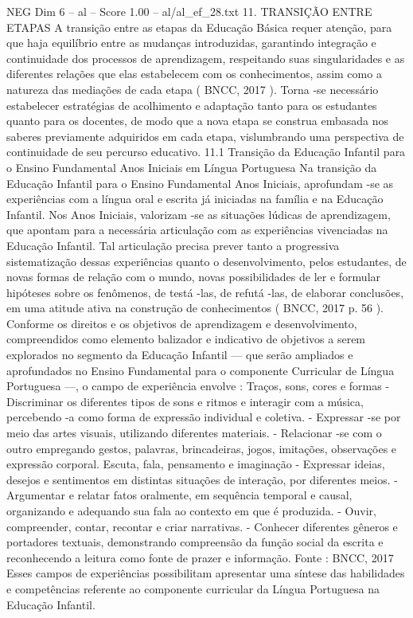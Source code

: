 \begin{textsample}{NEG Dim 6 – al – Score 1.00 – al/al\_ef\_28.txt}  \label{ex:f6_neg_066}
11.
TRANSIÇÃO ENTRE ETAPAS A transição entre as etapas da Educação Básica requer atenção, para que haja equilíbrio entre as mudanças introduzidas, garantindo integração e continuidade dos processos de aprendizagem, respeitando suas singularidades e as diferentes relações que elas estabelecem com os conhecimentos, assim como a natureza das mediações de cada etapa ( BNCC, 2017 ).
Torna -se necessário estabelecer estratégias de acolhimento e adaptação tanto para os estudantes quanto para os docentes, de modo que a nova etapa se construa embasada nos saberes previamente adquiridos em cada etapa, vislumbrando uma perspectiva de continuidade de seu percurso educativo. 11.1 Transição da Educação Infantil para o Ensino Fundamental Anos Iniciais em Língua Portuguesa Na transição da Educação Infantil para o Ensino Fundamental Anos Iniciais, aprofundam -se as experiências com a língua oral e escrita já iniciadas na família e na Educação Infantil.
Nos Anos Iniciais, valorizam -se as situações lúdicas de aprendizagem, que apontam para a necessária articulação com as experiências vivenciadas na Educação Infantil.
Tal articulação precisa prever tanto a progressiva sistematização dessas experiências quanto o desenvolvimento, pelos estudantes, de novas formas de relação com o mundo, novas possibilidades de ler e formular hipóteses sobre os fenômenos, de testá -las, de refutá -las, de elaborar conclusões, em uma atitude ativa na construção de conhecimentos ( BNCC, 2017 p. 56 ).
Conforme os direitos e os objetivos de aprendizagem e desenvolvimento, compreendidos como elemento balizador e indicativo de objetivos a serem explorados no segmento da Educação Infantil — que serão ampliados e aprofundados no Ensino Fundamental para o componente Curricular de Língua Portuguesa —, o campo de experiência envolve : Traços, sons, cores e formas - Discriminar os diferentes tipos de sons e ritmos e interagir com a música, percebendo -a como forma de expressão individual e coletiva. - Expressar -se por meio das artes visuais, utilizando diferentes materiais. - Relacionar -se com o outro empregando gestos, palavras, brincadeiras, jogos, imitações, observações e expressão corporal.
Escuta, fala, pensamento e imaginação - Expressar ideias, desejos e sentimentos em distintas situações de interação, por diferentes meios. - Argumentar e relatar fatos oralmente, em sequência temporal e causal, organizando e adequando sua fala ao contexto em que é produzida. - Ouvir, compreender, contar, recontar e criar narrativas. - Conhecer diferentes gêneros e portadores textuais, demonstrando compreensão da função social da escrita e reconhecendo a leitura como fonte de prazer e informação.
Fonte : BNCC, 2017 Esses campos de experiências possibilitam apresentar uma síntese das habilidades e competências referente ao componente curricular da Língua Portuguesa na Educação Infantil.

\end{textsample}
